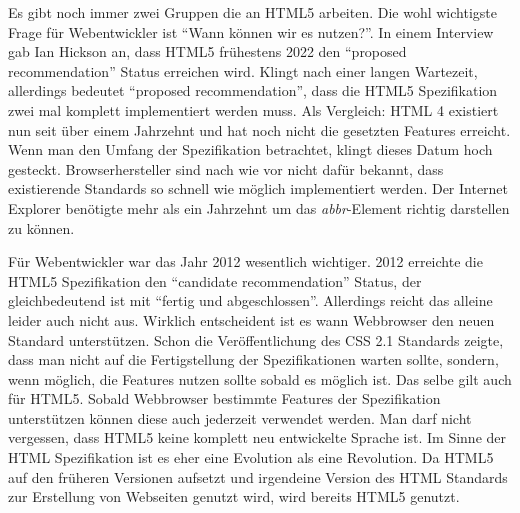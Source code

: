 Es gibt noch immer zwei Gruppen die an HTML5 arbeiten.
Die wohl wichtigste Frage für Webentwickler ist "`Wann können wir es nutzen?"'.
In einem Interview gab Ian Hickson an, dass HTML5 frühestens 2022 den ``proposed
recommendation'' Status erreichen wird. Klingt nach einer langen Wartezeit,
allerdings bedeutet ``proposed recommendation'', dass die HTML5 Spezifikation
zwei mal komplett implementiert werden muss. Als Vergleich: HTML 4 existiert nun
seit über einem Jahrzehnt und hat noch nicht die gesetzten Features erreicht.
Wenn man den Umfang der Spezifikation betrachtet, klingt dieses Datum hoch
gesteckt. Browserhersteller sind nach wie vor nicht dafür bekannt, dass
existierende Standards so schnell wie möglich implementiert werden. Der Internet
Explorer benötigte mehr als ein Jahrzehnt um das \textit{abbr}-Element richtig
darstellen zu können.

Für Webentwickler war das Jahr 2012 wesentlich wichtiger. 2012 erreichte die
HTML5 Spezifikation den ``candidate recommendation'' Status, der gleichbedeutend
ist mit "`fertig und abgeschlossen"'.
Allerdings reicht das alleine leider auch nicht aus. Wirklich entscheident ist
es wann Webbrowser den neuen Standard unterstützen. Schon die Veröffentlichung
des CSS 2.1 Standards zeigte, dass man nicht auf die Fertigstellung der
Spezifikationen warten sollte, sondern, wenn möglich, die Features nutzen sollte
sobald es möglich ist. Das selbe gilt auch für HTML5. Sobald Webbrowser
bestimmte Features der Spezifikation unterstützen können diese auch jederzeit
verwendet werden.
Man darf nicht vergessen, dass HTML5 keine komplett neu entwickelte Sprache ist.
Im Sinne der HTML Spezifikation ist es eher eine Evolution als eine Revolution.
Da HTML5 auf den früheren Versionen aufsetzt und irgendeine Version des HTML
Standards zur Erstellung von Webseiten genutzt wird, wird bereits HTML5 genutzt.



